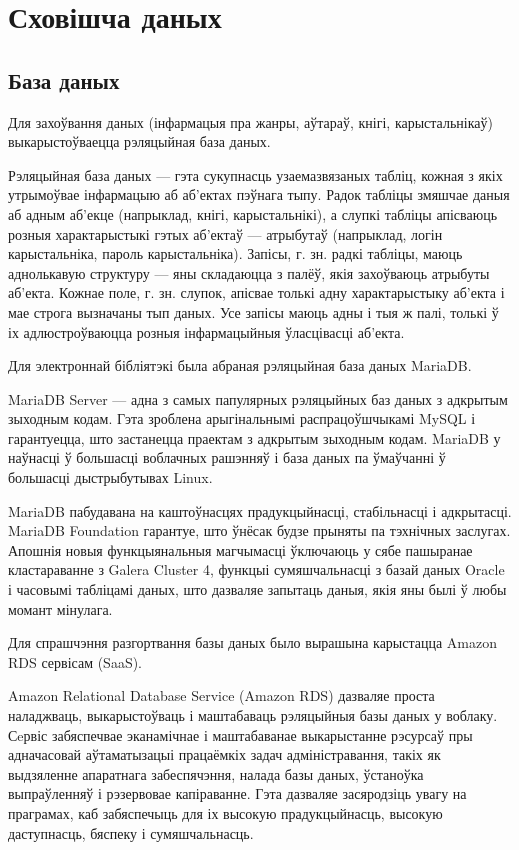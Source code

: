 \section{Сховішча даных}

\subsection{База даных}

Для захоўвання даных (інфармацыя пра жанры, аўтараў, кнігі, карыстальнікаў) выкарыстоўваецца
рэляцыйная база даных.

Рэляцыйная база даных --- гэта сукупнасць узаемазвязаных табліц, кожная з якіх утрымоўвае інфармацыю аб аб'ектах пэўнага тыпу. Радок табліцы змяшчае даныя аб адным аб'екце (напрыклад, кнігі, карыстальнікі), а слупкі табліцы апісваюць розныя характарыстыкі гэтых аб'ектаў --- атрыбутаў (напрыклад, логін карыстальніка, пароль карыстальніка). Запісы, г. зн. радкі табліцы, маюць аднолькавую структуру --- яны складаюцца з палёў, якія захоўваюць атрыбуты аб'екта. Кожнае поле, г. зн. слупок, апісвае толькі адну характарыстыку аб'екта і мае строга вызначаны тып даных. Усе запісы маюць адны і тыя ж палі, толькі ў іх адлюстроўваюцца розныя інфармацыйныя ўласцівасці аб'екта.

Для электроннай бібліятэкі была абраная рэляцыйная база даных MariaDB.

MariaDB Server --- адна з самых папулярных рэляцыйных баз даных з адкрытым зыходным кодам. Гэта зроблена арыгінальнымі распрацоўшчыкамі MySQL і гарантуецца, што застанецца праектам з адкрытым зыходным кодам.
MariaDB у наўнасці ў большасці воблачных рашэнняў і база даных па ўмаўчанні ў большасці дыстрыбутывах Linux.

MariaDB пабудавана на каштоўнасцях прадукцыйнасці, стабільнасці і адкрытасці. MariaDB Foundation гарантуе, што ўнёсак будзе прыняты па тэхнічных заслугах. Апошнія новыя функцыянальныя магчымасці ўключаюць у сябе пашыранае кластараванне з Galera Cluster 4, функцыі сумяшчальнасці з базай даных Oracle і часовымі табліцамі даных, што дазваляе запытаць даныя, якія яны былі ў любы момант мінулага.

Для спрашчэння разгортвання базы даных было вырашына карыстацца Amazon RDS сервісам (SaaS).

Amazon Relational Database Service (Amazon RDS) дазваляе проста наладжваць, выкарыстоўваць і маштабаваць рэляцыйныя базы даных у воблаку. Сeрвіс забяспечвае эканамічнае і маштабаванае выкарыстанне рэсурсаў пры адначасовай аўтаматызацыі працаёмкіх задач адміністравання, такіх як выдзяленне апаратнага забеспячэння, налада базы даных, ўстаноўка выпраўленняў і рэзервовае капіраванне. Гэта дазваляе засяродзіць увагу на праграмах, каб забяспечыць для іх высокую прадукцыйнасць, высокую даступнасць, бяспеку і сумяшчальнасць.

